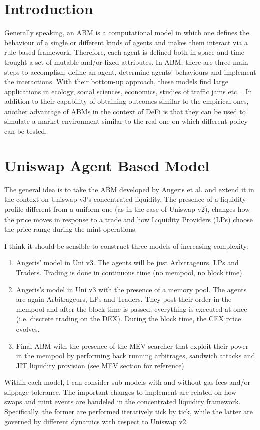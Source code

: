 \documentclass[a4paper,11pt]{article}
\begin{document}
\section{Introduction}
Generally speaking, an ABM is a computational model in which one defines the behaviour of a single or different kinds of agents and makes them interact via a rule-based framework. Therefore, each agent is defined both in space and time trought a set of mutable and/or fixed attributes. In ABM, there are three main steps to accomplish: define an agent, determine agents' behaviours and implement the interactions. With their bottom-up approach, these models find large applications in ecology, social sciences, economics, studies of traffic jams etc. \cite{ABM}. In addition to their capability of obtaining outcomes similar to the empirical ones, another advantage of ABMs in the context of DeFi is that they can be used to simulate a market environment similar to the real one on which different policy can be tested.

\section{Uniswap Agent Based Model}
The general idea is to take the ABM developed by Angeris et al. \cite{angeris2021analysisuniswapmarkets} and extend it in the context on Uniswap v3’s concentrated liquidity. The presence of a liquidity profile different from a uniform one (as in the case of Uniswap v2), changes how the price moves in response to a trade and how Liquidity Providers (LPs) choose the price range during the mint operations.

I think it should be sensible to construct three models of increasing complexity:

\begin{enumerate}
    \item Angeris’ model in Uni v3. The agents will be just Arbitrageurs, LPs and Traders. Trading is done in continuous time (no mempool, no block time).
    \item Angeris’s model in Uni v3 with the presence of a memory pool. The agents are again Arbitrageurs, LPs and Traders. They post their order in the mempool and after the block time is passed, everything is executed at once (i.e. discrete trading on the DEX). During the block time, the CEX price evolves.
    \item Final ABM with the presence of the MEV searcher that exploit their power in the mempool by performing back running arbitrages, sandwich attacks and JIT liquidity provision (see MEV section for reference)
\end{enumerate}
Within each model, I can consider sub models with and without gas fees and/or slippage tolerance. The important changes to implement are related on how swaps and mint events are handeled in the concentrated liquidity framework. Specifically, the former are performed iteratively tick by tick, while the latter are governed by different dynamics with respect to Uniswap v2.
\end{document}
